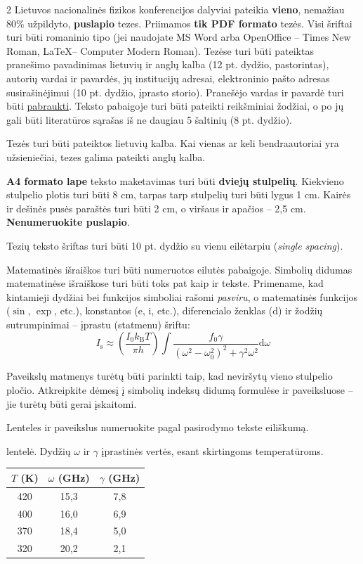 \documentclass[a4paper,10pt,lithuanian]{article}
\begin{document}
\begin{multicols*}{2}
Lietuvos nacionalinės fizikos konferencijos dalyviai pateikia \textbf{vieno}, nemažiau 80\% užpildyto, \textbf{puslapio} tezes. Priimamos \textbf{tik PDF formato} tezės. Visi šriftai turi būti romaninio tipo (jei naudojate MS Word arba OpenOffice -- Times New Roman, \LaTeX -- Computer Modern Roman). Tezėse turi būti pateiktas pranešimo pavadinimas lietuvių ir anglų kalba (12 pt. dydžio, pastorintas), autorių vardai ir pavardės, jų institucijų adresai, elektroninio pašto adresas susirašinėjimui (10 pt. dydžio, įprasto storio). Pranešėjo vardas ir pavardė turi būti \uline{pabraukti}. Teksto pabaigoje turi būti pateikti reikšminiai žodžiai, o po jų gali būti literatūros sąrašas iš ne daugiau 5 šaltinių (8 pt. dydžio).

Tezės turi būti pateiktos lietuvių kalba. Kai vienas ar keli bendraautoriai yra užsieniečiai, tezes galima pateikti anglų kalba.

\textbf{A4 formato lape} teksto maketavimas turi būti \textbf{dviejų stulpelių}. Kiekvieno stulpelio plotis turi būti 8 cm, tarpas tarp stulpelių turi būti lygus 1 cm. Kairės ir dešinės pusės paraštės turi būti 2 cm, o viršaus ir apačios -- 2,5 cm. \textbf{Nenumeruokite puslapio}.

Tezių teksto šriftas turi būti 10 pt. dydžio su vienu eilėtarpiu (\textit{single spacing}).

Matematinės išraiškos turi būti numeruotos eilutės pabaigoje. Simbolių didumas matematinėse išraiškose turi būti toks pat kaip ir tekste. Primename, kad kintamieji dydžiai bei funkcijos simboliai rašomi \textit{pasviru}, o matematinės funkcijos ($\sin$, $\exp$, etc.), konstantos ($\mathrm{e}$, $\mathrm{i}$, etc.), diferencialo ženklas ($\mathrm{d}$) ir žodžių sutrumpinimai -- įprastu (statmenu) šriftu:
\begin{equation}
I_\mathrm{s}\approx\left( \frac{I_0k_\mathrm{B}T}{\pi h} \right) \int \frac{f_0\gamma}{(\omega^2-\omega_0^2)^2+\gamma^2\omega^2} \mathrm{d}\omega
\end{equation}

Paveikslų matmenys turėtų būti parinkti taip, kad neviršytų vieno stulpelio pločio. Atkreipkite dėmesį į simbolių indeksų didumą formulėse ir paveiksluose -- jie turėtų būti gerai įskaitomi.

Lenteles ir paveikslus numeruokite pagal pasirodymo tekste eiliškumą.

\vspace{10pt}  lentelė. Dydžių $\omega$ ir $\gamma$ įprastinės vertės, esant skirtingoms temperatūroms.
\begin{center}
\begin{tabular}{ccc}
\hline
$T$ (K) & $\omega$ (GHz) & $\gamma$ (GHz) \\
\hline
420 & 15,3 & 7,8 \\
400 & 16,0 & 6,9 \\
370 & 18,4 & 5,0 \\
320 & 20,2 & 2,1 \\
\hline
\end{tabular}
\end{center}


\end{multicols*}
\end{document}
